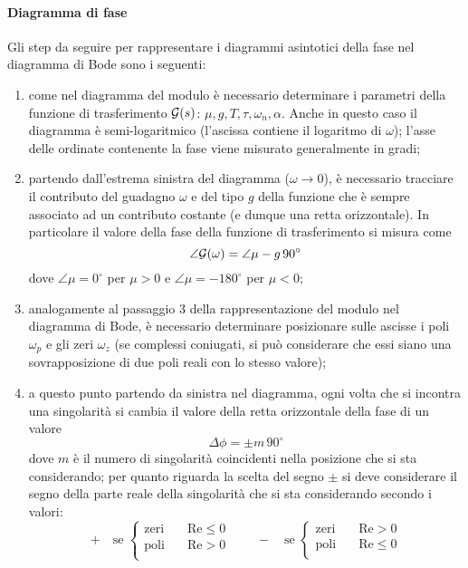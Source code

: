 			\paragraph{Diagramma di fase} Gli step da seguire per rappresentare i diagrammi asintotici della fase nel diagramma di Bode sono i seguenti:
			\begin{enumerate}
				\item come nel diagramma del modulo è necessario determinare i parametri della funzione di trasferimento $\mathcal G(s)$: $\mu, g, T, \tau, \omega_n, \alpha$. Anche in questo caso il diagramma è semi-logaritmico (l'ascissa contiene il logaritmo di $\omega$); l'asse delle ordinate contenente la fase viene misurato generalmente in gradi;
				
				\item partendo dall'estrema sinistra del diagramma ($\omega\rightarrow 0$), è necessario tracciare il contributo del guadagno $\omega$ e del tipo $g$ della funzione che è sempre associato ad un contributo costante (e dunque una retta orizzontale). In particolare il valore della fase della funzione di trasferimento si misura come
				\[ \angle \mathcal G(\omega) = \angle \mu - g \, 90^\circ \]
				dove $\angle \mu = 0^\circ$ per $\mu > 0 $ e $\angle \mu = -180^\circ$ per $\mu < 0$;
				
				\item analogamente al passaggio 3 della rappresentazione del modulo nel diagramma di Bode, è necessario determinare posizionare sulle ascisse i poli $\omega_p$ e gli zeri $\omega_z$ (se complessi coniugati, si può considerare che essi siano una sovrapposizione di due poli reali con lo stesso valore);
				
				\item a questo punto partendo da sinistra nel diagramma, ogni volta che si incontra una singolarità si cambia il valore della retta orizzontale della fase di un valore
				\[  \Delta \phi = \pm m \, 90^\circ \]
				dove $m$ è il numero di singolarità coincidenti nella posizione che si sta considerando; per quanto riguarda la scelta  del segno $\pm$ si deve considerare il segno della parte reale della singolarità che si sta considerando secondo i valori:
				\[ + \quad \textrm{se } \begin{cases}
					\textrm{zeri} \quad & \textrm{Re} \leq 0 \\
					\textrm{poli} \quad & \textrm{Re} > 0 \\
				\end{cases} \qquad - \quad \textrm{se } \begin{cases}
					\textrm{zeri} \quad & \textrm{Re} > 0 \\
					\textrm{poli} \quad & \textrm{Re} \leq 0 \\
				\end{cases} \]
			\end{enumerate}
		
		
		
		
		
		
		